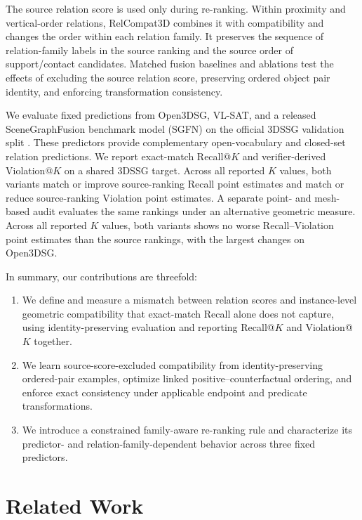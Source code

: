 The source relation score is used only during re-ranking. Within proximity and vertical-order relations, RelCompat3D combines it with compatibility and changes the order within each relation family. It preserves the sequence of relation-family labels in the source ranking and the source order of support/contact candidates. Matched fusion baselines and ablations test the effects of excluding the source relation score, preserving ordered object pair identity, and enforcing transformation consistency. 

We evaluate fixed predictions from Open3DSG, VL-SAT, and a released SceneGraphFusion benchmark model (SGFN) on the official 3DSSG validation split \cite{wang2023vl,koch2024open3dsg,wu2021scenegraphfusion}. These predictors provide complementary open-vocabulary and closed-set relation predictions. We report exact-match Recall@$K$ and verifier-derived Violation@$K$ on a shared 3DSSG target. Across all reported $K$ values, both variants match or improve source-ranking Recall point estimates and match or reduce source-ranking Violation point estimates. A separate point- and mesh-based audit evaluates the same rankings under an alternative geometric measure. Across all reported $K$ values, both variants shows no worse Recall--Violation point estimates than the source rankings, with the largest changes on Open3DSG. 

In summary, our contributions are threefold:
\begin{enumerate}
    \item We define and measure a mismatch between relation scores and instance-level geometric compatibility that exact-match Recall alone does not capture, using identity-preserving evaluation and reporting Recall@$K$ and Violation@$K$ together. 
    \item We learn source-score-excluded compatibility from identity-preserving ordered-pair examples, optimize linked positive--counterfactual ordering, and enforce exact consistency under applicable endpoint and predicate transformations.
    \item We introduce a constrained family-aware re-ranking rule and characterize its predictor- and relation-family-dependent behavior across three fixed predictors.
\end{enumerate}


\section{Related Work}

